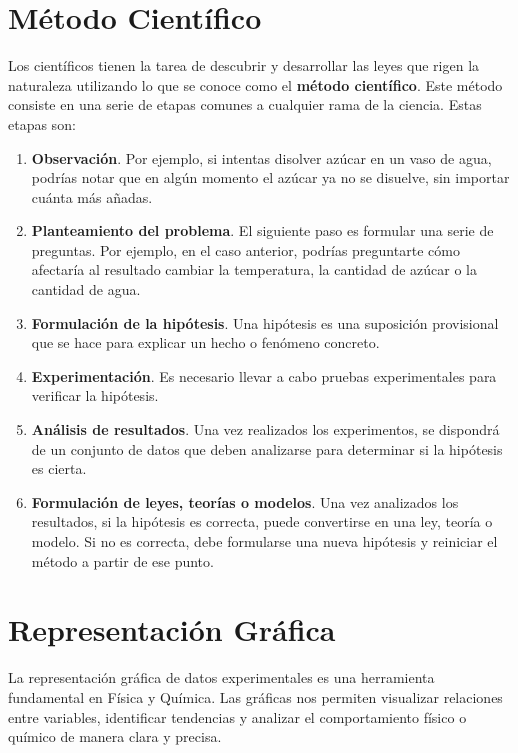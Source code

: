 

\section{Método Científico}
Los científicos tienen la tarea de descubrir y desarrollar las leyes que rigen la naturaleza utilizando lo que se conoce como el \textbf{método científico}.
Este método consiste en una serie de etapas comunes a cualquier rama de la ciencia.
Estas etapas son:
\begin{enumerate}[label=\numberballmDarkTeal]
        \item \textbf{Observación}.
        Por ejemplo, si intentas disolver azúcar en un vaso de agua, podrías notar que en algún momento el azúcar ya no se disuelve, sin importar cuánta más añadas.
        \item \textbf{Planteamiento del problema}.
        El siguiente paso es formular una serie de preguntas.
        Por ejemplo, en el caso anterior, podrías preguntarte cómo afectaría al resultado cambiar la temperatura, la cantidad de azúcar o la cantidad de agua.
        \item \textbf{Formulación de la hipótesis}.
        Una hipótesis es una suposición provisional que se hace para explicar un hecho o fenómeno concreto.
        \item \textbf{Experimentación}.
        Es necesario llevar a cabo pruebas experimentales para verificar la hipótesis.
        \item \textbf{Análisis de resultados}.
        Una vez realizados los experimentos, se dispondrá de un conjunto de datos que deben analizarse para determinar si la hipótesis es cierta.
        \item \textbf{Formulación de leyes, teorías o modelos}.
        Una vez analizados los resultados, si la hipótesis es correcta, puede convertirse en una ley, teoría o modelo.
        Si no es correcta, debe formularse una nueva hipótesis y reiniciar el método a partir de ese punto.
\end{enumerate}


\section{Representación Gráfica}
La representación gráfica de datos experimentales es una herramienta fundamental en Física y Química.
Las gráficas nos permiten visualizar relaciones entre variables, identificar tendencias y analizar el comportamiento físico o químico de manera clara y precisa.

